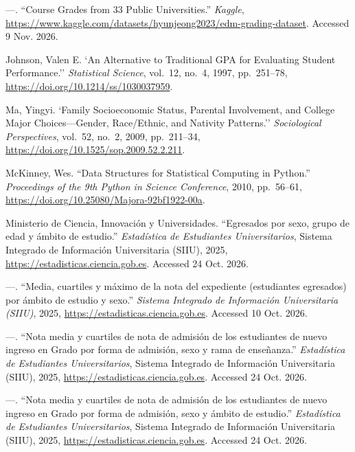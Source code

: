 \begin{list}{}{\setlength{\leftmargin}{1.5em}\setlength{\itemindent}{-1.5em}\setlength{\itemsep}{0.25em}\setlength{\parsep}{0pt}}
\item ---. ``Course Grades from 33 Public Universities.'' \textit{Kaggle}, \url{https://www.kaggle.com/datasets/hyunjeong2023/edm-grading-dataset}. Accessed 9 Nov. 2026.
\item Johnson, Valen E. `An Alternative to Traditional GPA for Evaluating Student Performance.'' \textit{Statistical Science}, vol.~12, no.~4, 1997, pp.~251--78, \url{https://doi.org/10.1214/ss/1030037959}.
\item Ma, Yingyi. `Family Socioeconomic Status, Parental Involvement, and College Major Choices---Gender, Race/Ethnic, and Nativity Patterns.'' \textit{Sociological Perspectives}, vol.~52, no.~2, 2009, pp.~211--34, \url{https://doi.org/10.1525/sop.2009.52.2.211}.
\item McKinney, Wes. ``Data Structures for Statistical Computing in Python.'' \textit{Proceedings of the 9th Python in Science Conference}, 2010, pp.~56--61, \url{https://doi.org/10.25080/Majora-92bf1922-00a}.
\item Ministerio de Ciencia, Innovaci\'on y Universidades. ``Egresados por sexo, grupo de edad y \'ambito de estudio.'' \textit{Estad\'istica de Estudiantes Universitarios}, Sistema Integrado de Informaci\'on Universitaria (SIIU), 2025, \url{https://estadisticas.ciencia.gob.es}. Accessed 24 Oct. 2026.
\item ---. ``Media, cuartiles y m\'aximo de la nota del expediente (estudiantes egresados) por \'ambito de estudio y sexo.'' \textit{Sistema Integrado de Informaci\'on Universitaria (SIIU)}, 2025, \url{https://estadisticas.ciencia.gob.es}. Accessed 10 Oct. 2026.
\item ---. ``Nota media y cuartiles de nota de admisi\'on de los estudiantes de nuevo ingreso en Grado por forma de admisi\'on, sexo y rama de ense\~nanza.'' \textit{Estad\'istica de Estudiantes Universitarios}, Sistema Integrado de Informaci\'on Universitaria (SIIU), 2025, \url{https://estadisticas.ciencia.gob.es}. Accessed 24 Oct. 2026.
\item ---. ``Nota media y cuartiles de nota de admisi\'on de los estudiantes de nuevo ingreso en Grado por forma de admisi\'on, sexo y \'ambito de estudio.'' \textit{Estad\'istica de Estudiantes Universitarios}, Sistema Integrado de Informaci\'on Universitaria (SIIU), 2025, \url{https://estadisticas.ciencia.gob.es}. Accessed 24 Oct. 2026.

\end{list}
